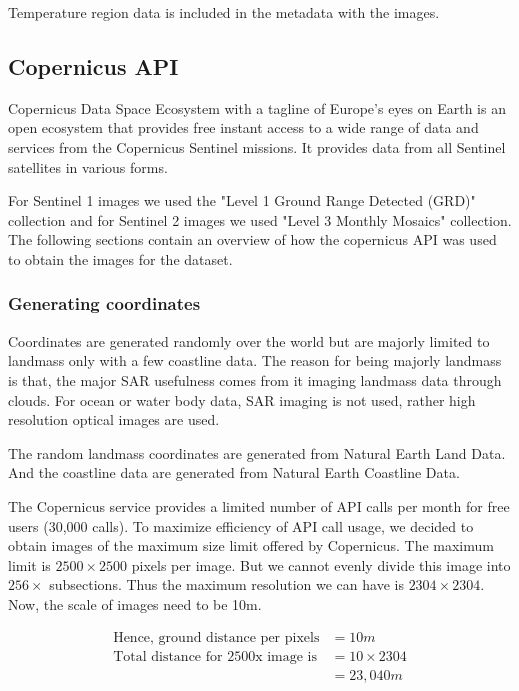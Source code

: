 Temperature region data is included in the metadata with the images.

\subsection{Copernicus API}

Copernicus Data Space Ecosystem with a tagline of Europe's eyes on Earth is an open ecosystem that provides free instant access to a wide range of data and services from the Copernicus Sentinel missions\cite{copernicusHome}. It provides data from all Sentinel satellites in various forms.

For Sentinel 1 images we used the "Level 1 Ground Range Detected (GRD)" collection and for Sentinel 2 images we used "Level 3 Monthly Mosaics" collection. The following sections contain an overview of how the copernicus API was used to obtain the images for the dataset.

\subsubsection{Generating coordinates}

Coordinates are generated randomly over the world but are majorly limited to landmass only with a few coastline data. The reason for being majorly landmass is that, the major SAR usefulness comes from it imaging landmass data through clouds. For ocean or water body data, SAR imaging is not used, rather high resolution optical images are used.

The random landmass coordinates are generated from Natural Earth Land Data\cite{naturalearthland}. And the coastline data are generated from Natural Earth Coastline Data\cite{naturalearthcoast}.

The Copernicus service provides a limited number of API calls per month for free users (30,000 calls). To maximize efficiency of API call usage, we decided to obtain images of the maximum size limit offered by Copernicus. The maximum limit is $2500\times2500$ pixels per image. But we cannot evenly divide this image into $256\times$ subsections. Thus the maximum resolution we can have is $2304\times2304$. Now, the scale of images need to be 10m.

\begin{align*}
    \text{Hence, ground distance per pixels} &= 10m \\
    \text{Total distance for 2500x image is} &= 10\times2304 \\
    &= 23,040m
\end{align*}


